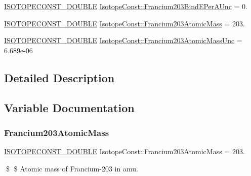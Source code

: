 \begin{DoxyCompactItemize}
\mbox{\hyperlink{group___isotope_const-_macros_ga8f45a7272ce02c0b4c65c44636ed719a}{I\+S\+O\+T\+O\+P\+E\+C\+O\+N\+S\+T\+\_\+\+D\+O\+U\+B\+LE}} \mbox{\hyperlink{group___isotope_const-_francium-_fr203_ga3b78e77a0264bb019f5459ab9aeba04c}{Isotope\+Const\+::\+Francium203\+Bind\+E\+Per\+A\+Unc}} = 0.
\item 
\mbox{\hyperlink{group___isotope_const-_macros_ga8f45a7272ce02c0b4c65c44636ed719a}{I\+S\+O\+T\+O\+P\+E\+C\+O\+N\+S\+T\+\_\+\+D\+O\+U\+B\+LE}} \mbox{\hyperlink{group___isotope_const-_francium-_fr203_ga625044e5dc4753e5b4b6a32337d04f33}{Isotope\+Const\+::\+Francium203\+Atomic\+Mass}} = 203.
\item 
\mbox{\hyperlink{group___isotope_const-_macros_ga8f45a7272ce02c0b4c65c44636ed719a}{I\+S\+O\+T\+O\+P\+E\+C\+O\+N\+S\+T\+\_\+\+D\+O\+U\+B\+LE}} \mbox{\hyperlink{group___isotope_const-_francium-_fr203_gaee75b74d08982e8ca3ca6e929c606376}{Isotope\+Const\+::\+Francium203\+Atomic\+Mass\+Unc}} = 6.\+689e-\/06
\end{DoxyCompactItemize}


\subsection{Detailed Description}


\subsection{Variable Documentation}
\mbox{\label{group___isotope_const-_francium-_fr203_ga625044e5dc4753e5b4b6a32337d04f33}} 
\subsubsection{\texorpdfstring{Francium203\+Atomic\+Mass}{Francium203AtomicMass}}
{\footnotesize\ttfamily \mbox{\hyperlink{group___isotope_const-_macros_ga8f45a7272ce02c0b4c65c44636ed719a}{I\+S\+O\+T\+O\+P\+E\+C\+O\+N\+S\+T\+\_\+\+D\+O\+U\+B\+LE}} Isotope\+Const\+::\+Francium203\+Atomic\+Mass = 203.}

\$ \$ Atomic mass of Francium-\/203 in amu. \mbox{\label{group___isotope_const-_francium-_fr203_gaee75b74d08982e8ca3ca6e929c606376}} 
